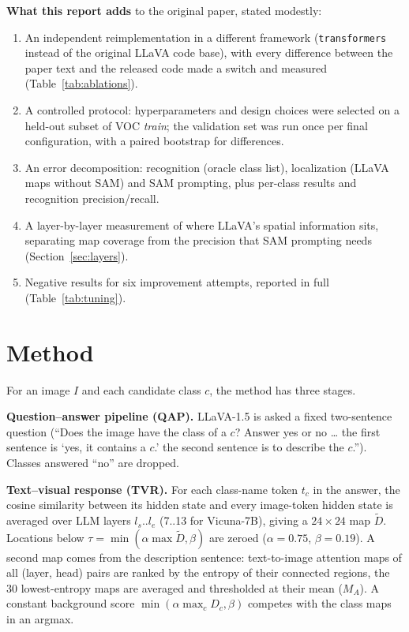 \documentclass[10pt]{article}
\begin{document}
\textbf{What this report adds} to the original paper, stated modestly:
\begin{enumerate}
\item An independent reimplementation in a different framework (\texttt{transformers} instead of the original LLaVA
code base), with every difference between the paper text and the released code made a switch and measured
(Table~\ref{tab:ablations}).
\item A controlled protocol: hyperparameters and design choices were selected on a held-out subset of VOC
\emph{train}; the validation set was run once per final configuration, with a paired bootstrap for differences.
\item An error decomposition: recognition (oracle class list), localization (LLaVA maps without SAM) and SAM
prompting, plus per-class results and recognition precision/recall.
\item A layer-by-layer measurement of where LLaVA's spatial information sits, separating map coverage from the precision
that SAM prompting needs (Section~\ref{sec:layers}).
\item Negative results for six improvement attempts, reported in full (Table~\ref{tab:tuning}).
\end{enumerate}

\section{Method}
For an image $I$ and each candidate class $c$, the method has three stages.

\textbf{Question--answer pipeline (QAP).} LLaVA-1.5 is asked a fixed two-sentence question (``Does the image have the
class of a $c$? Answer yes or no \ldots{} the first sentence is `yes, it contains a $c$.' the second sentence is to
describe the $c$.''). Classes answered ``no'' are dropped.

\textbf{Text--visual response (TVR).} For each class-name token $t_c$ in the answer, the cosine similarity between its
hidden state and every image-token hidden state is averaged over LLM layers $l_s..l_e$ (7..13 for Vicuna-7B), giving a
$24{\times}24$ map $\tilde D$. Locations below $\tau=\min(\alpha\max\tilde D, \beta)$ are zeroed ($\alpha=0.75$,
$\beta=0.19$). A second map comes from the description sentence: text-to-image attention maps of all (layer, head) pairs
are ranked by the entropy of their connected regions, the 30 lowest-entropy maps are averaged and thresholded at their
mean ($M_A$). A constant background score $\min(\alpha\max_c D_c, \beta)$ competes with the class maps in an argmax.
\end{document}
